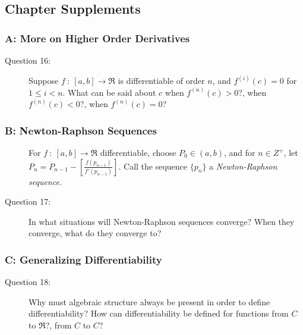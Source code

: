 \documentclass{article}
\begin{document}
\subsection*{Chapter Supplements}


\subsubsection*{A: More on Higher Order Derivatives}

\begin{description}

  \item[Question 16:] Suppose $f\ :\ [a,b] \to \Re$ is differentiable of order $n$, and $f^{(i)}(c) = 0$ for $1 \leq i < n$. What can be said about $c$ when $f^{(n)}(c) > 0$?, when $f^{(n)}(c) < 0$?, when $f^{(n)}(c) = 0$?

\end{description}


\subsubsection*{B: Newton-Raphson Sequences}

\begin{description}

  \item[] For $f\ :\ [a,b] \to \Re$ differentiable, choose $P_0 \in (a,b)$, and for $n \in Z^+$, let $P_n = P_{n-1} - \left[ \frac{ f(p_{n-1}) }{ f'(p_{n-1}) } \right]$. Call the sequence $\{ p_n \}$ a \emph{Newton-Raphson sequence}.

  \item[Question 17:] In what situations will Newton-Raphson sequences converge? When they converge, what do they converge to?

\end{description}


\subsubsection*{C: Generalizing Differentiability}

\begin{description}

  \item[Question 18:] Why must algebraic structure always be present in order to define differentiability? How can differentiability be defined for functions from $C$ to $\Re$?, from $C$ to $C$?

\end{description}
\end{document}
